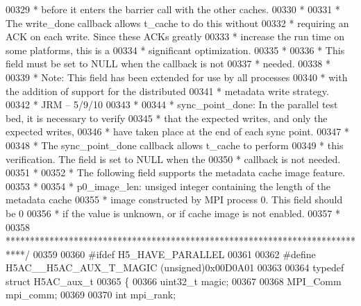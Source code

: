 \begin{DoxyCode}
00329 \textcolor{comment}{ *              before it enters the barrier call with the other caches.}
00330 \textcolor{comment}{ *}
00331 \textcolor{comment}{ *              The write\_done callback allows t\_cache to do this without}
00332 \textcolor{comment}{ *              requiring an ACK on each write.  Since these ACKs greatly}
00333 \textcolor{comment}{ *              increase the run time on some platforms, this is a}
00334 \textcolor{comment}{ *              significant optimization.}
00335 \textcolor{comment}{ *}
00336 \textcolor{comment}{ *              This field must be set to NULL when the callback is not}
00337 \textcolor{comment}{ *              needed.}
00338 \textcolor{comment}{ *}
00339 \textcolor{comment}{ *      Note: This field has been extended for use by all processes}
00340 \textcolor{comment}{ *            with the addition of support for the distributed }
00341 \textcolor{comment}{ *            metadata write strategy.        }
00342 \textcolor{comment}{ *                                                     JRM -- 5/9/10}
00343 \textcolor{comment}{ *}
00344 \textcolor{comment}{ * sync\_point\_done:  In the parallel test bed, it is necessary to verify}
00345 \textcolor{comment}{ *      that the expected writes, and only the expected writes,}
00346 \textcolor{comment}{ *      have taken place at the end of each sync point.}
00347 \textcolor{comment}{ *}
00348 \textcolor{comment}{ *      The sync\_point\_done callback allows t\_cache to perform }
00349 \textcolor{comment}{ *      this verification.  The field is set to NULL when the }
00350 \textcolor{comment}{ *      callback is not needed.}
00351 \textcolor{comment}{ *}
00352 \textcolor{comment}{ * The following field supports the metadata cache image feature.}
00353 \textcolor{comment}{ *}
00354 \textcolor{comment}{ * p0\_image\_len: unsiged integer containing the length of the metadata cache}
00355 \textcolor{comment}{ *      image constructed by MPI process 0.  This field should be 0}
00356 \textcolor{comment}{ *      if the value is unknown, or if cache image is not enabled.}
00357 \textcolor{comment}{ *}
00358 \textcolor{comment}{ ****************************************************************************/}
00359 
00360 \textcolor{preprocessor}{#ifdef H5\_HAVE\_PARALLEL}
00361 
00362 \textcolor{preprocessor}{#define H5AC\_\_H5AC\_AUX\_T\_MAGIC        (unsigned)0x00D0A01}
00363 
00364 \textcolor{keyword}{typedef} \textcolor{keyword}{struct }H5AC\_aux\_t
00365 \{
00366     uint32\_t    magic;
00367 
00368     MPI\_Comm    mpi\_comm;
00369 
00370     \textcolor{keywordtype}{int}     mpi\_rank;

\end{DoxyCode}
